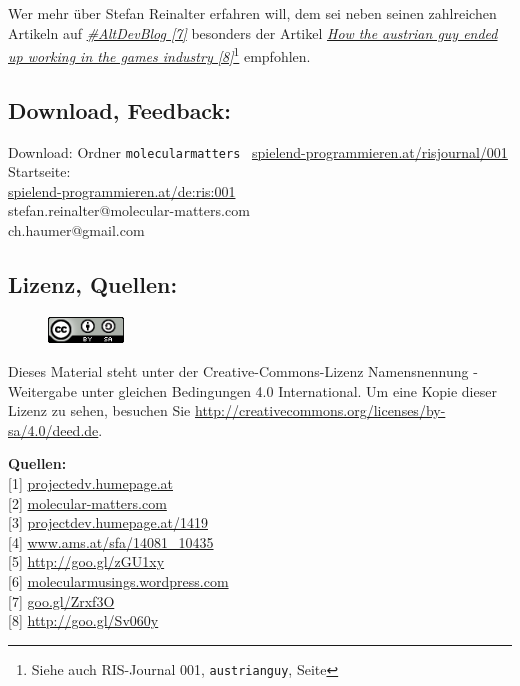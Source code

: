 \documentclass[10pt,a4paper,ngerman,twoside]{article} %
\begin{document}
\begin{multicols}{3}
Wer mehr über Stefan Reinalter erfahren will, dem sei neben seinen zahlreichen Artikeln auf \href{http://www.altdevblogaday.com/author/stefan-reinalter/}{\textit{\#AltDevBlog [7]}} besonders der Artikel \href{http://www.altdevblogaday.com/2011/09/27/how-the-austrian-guy-ended-up-working-in-the-games-industry/}{\textit{How the austrian guy ended up working in the games industry [8]}}\footnote{Siehe auch RIS-Journal 001, \texttt{austrianguy}, Seite \pageref{austrianguy}} empfohlen.

\subsection*{Download, Feedback:}
\footnotesize{
Download: Ordner \texttt{molecularmatters} \Mundus\ \href{http://spielend-programmieren.at/risjournal/001}{spielend-programmieren.at/risjournal/001}\\
Startseite:\\
\href{http://spielend-programmieren.at/de:ris:001}{spielend-programmieren.at/de:ris:001}\\ 
\Letter\: stefan.reinalter@molecular-matters.com\\
\Letter\: ch.haumer@gmail.com\\}
\normalsize 

\subsection*{Lizenz, Quellen:}

\begin{figure}
\includegraphics[width=2cm]{molecularmatters/ccbysa88x31.png}
\end{figure}
Dieses Material steht unter der Creative-Commons-Lizenz Namensnennung - Weitergabe unter gleichen Bedingungen 4.0 International. Um eine Kopie dieser Lizenz zu sehen, besuchen Sie \url{http://creativecommons.org/licenses/by-sa/4.0/deed.de}.

\textbf{Quellen:} \\
{[}1{]} \href{http://projectdev.humepage.at/}{projectedv.humepage.at} \\
{[}2{]} \href{http://www.molecular-matters.com/}{molecular-matters.com} \\
{[}3{]} \href{http://projectdev.humepage.at/1419}{projectdev.humepage.at/1419} \\
{[}4{]} \href{http://www.ams.at/sfa/14081_10435.html}{www.ams.at/sfa/14081\_10435} \\
{[}5{]} \href{https://www.gruenderservice.at/Content.Node/gruenden/Jungunternehmerfoerderungen.html}{http://goo.gl/zGU1xy} \\
{[}6{]} \href{http://molecularmusings.wordpress.com/}{molecularmusings.wordpress.com} \\
{[}7{]} \href{http://www.altdevblogaday.com/author/stefan-reinalter/}{goo.gl/Zrxf3O} \\
{[}8{]} \href{http://www.altdevblogaday.com/2011/09/27/how-the-austrian-guy-ended-up-working-in-the-games-industry/}{http://goo.gl/Sv060y} 




\end{multicols}
\end{document}
